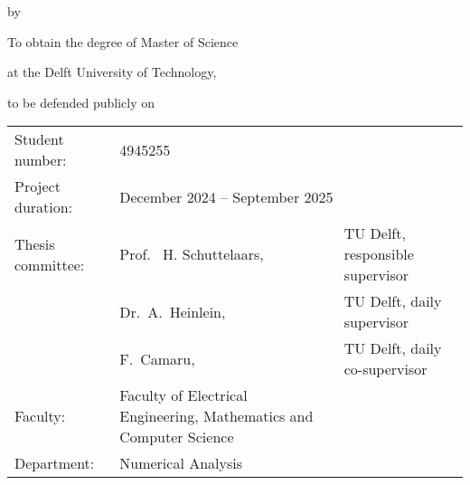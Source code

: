 \begin{titlepage}

    \begin{center}

        {\makeatletter
            \largecoverstyle\fontsize{45}{45}\selectfont\@title
            \makeatother}

        {\makeatletter
            \ifdefvoid{\@subtitle}{}{\bigskip\coverstyle\fontsize{20}{20}\selectfont\@subtitle}
            \makeatother}

        \bigskip
        \bigskip

        by

        \bigskip
        \bigskip

        {\makeatletter
            \coverstyle\fontsize{25}{25}\selectfont\@author
            \makeatother}

        \bigskip
        \bigskip

        To obtain the degree of Master of Science

        at the Delft University of Technology,


        to be defended publicly on {\makeatletter
                \makeatother}

        \vfill

        \begin{tabular}{lll}
            Student number:   & 4945255                                                                                                \\
            Project duration: & \multicolumn{2}{l}{December 2024 -- September 2025}                                                    \\
            Thesis committee: & Prof. \ H. Schuttelaars,                                            & TU Delft, responsible supervisor \\
                              & Dr.\ A.\ Heinlein,                                                  & TU Delft, daily supervisor       \\
                              & F.\ Camaru,                                                         & TU Delft, daily co-supervisor    \\
            Faculty:          & Faculty of Electrical Engineering, Mathematics and Computer Science                                    \\
            Department:       & Numerical Analysis                                                                                     \\
        \end{tabular}


\end{center}
\end{titlepage}
